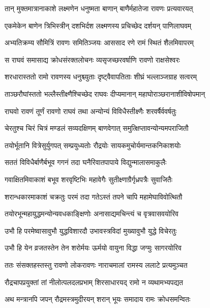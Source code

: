 \twolineshloka
{तान् मुक्तमात्रानाकाशे लक्ष्मणेन धनुष्मता}
{बाणान् बाणैर्महातेजा रावणः प्रत्यवारयत्} %

\twolineshloka
{एकमेकेन बाणेन त्रिभिस्त्रीन् दशभिर्दश}
{लक्ष्मणस्य प्रचिच्छेद दर्शयन् पाणिलाघवम्} %

\twolineshloka
{अभ्यतिक्रम्य सौमित्रिं रावणः समितिञ्जयः}
{आससाद रणे रामं स्थितं शैलमिवापरम्} %

\twolineshloka
{स राघवं समासाद्य क्रोधसंरक्तलोचनः}
{व्यसृजच्छरवर्षाणि रावणो राक्षसेश्वरः} %

\twolineshloka
{शरधारास्ततो रामो रावणस्य धनुश्च्युताः}
{दृष्ट्वैवापतिताः शीघ्रं भल्लाञ्जग्राह सत्वरम्} %

\twolineshloka
{ताञ्छरौघांस्ततो भल्लैस्तीक्ष्णैश्चिच्छेद राघवः}
{दीप्यमानान् महाघोराञ्छरानाशीविषोपमान्} %

\twolineshloka
{राघवो रावणं तूर्णं रावणो राघवं तथा}
{अन्योन्यं विविधैस्तीक्ष्णैः शरवर्षैर्ववर्षतुः} %

\twolineshloka
{चेरतुश्च चिरं चित्रं मण्डलं सव्यदक्षिणम्}
{बाणवेगात् समुत्क्षिप्तावन्योन्यमपराजितौ} %

\twolineshloka
{तयोर्भूतानि वित्रेसुर्युगपत् सम्प्रयुध्यतोः}
{रौद्रयोः सायकमुचोर्यमान्तकनिकाशयोः} %

\twolineshloka
{सततं विविधैर्बाणैर्बभूव गगनं तदा}
{घनैरिवातपापाये विद्युन्मालासमाकुलैः} %

\twolineshloka
{गवाक्षितमिवाकाशं बभूव शरवृष्टिभिः}
{महावेगैः सुतीक्ष्णाग्रैर्गृध्रपत्रैः सुवाजितैः} %

\twolineshloka
{शरान्धकारमाकाशं चक्रतुः परमं तदा}
{गतेऽस्तं तपने चापि महामेघाविवोत्थितौ} %

\twolineshloka
{तयोरभून्महायुद्धमन्योन्यवधकाङ्क्षिणोः}
{अनासाद्यमचिन्त्यं च वृत्रवासवयोरिव} %

\twolineshloka
{उभौ हि परमेष्वासावुभौ युद्धविशारदौ}
{उभावस्त्रविदां मुख्यावुभौ युद्धे विचेरतुः} %

\twolineshloka
{उभौ हि येन व्रजतस्तेन तेन शरोर्मयः}
{ऊर्मयो वायुना विद्धा जग्मुः सागरयोरिव} %

\twolineshloka
{ततः संसक्तहस्तस्तु रावणो लोकरावणः}
{नाराचमालां रामस्य ललाटे प्रत्यमुञ्चत} %

\twolineshloka
{रौद्रचापप्रयुक्तां तां नीलोत्पलदलप्रभाम्}
{शिरसाधारयद् रामो न व्यथामभ्यपद्यत} %

\twolineshloka
{अथ मन्त्रानपि जपन् रौद्रमस्त्रमुदीरयन्}
{शरान् भूयः समादाय रामः क्रोधसमन्वितः} %

